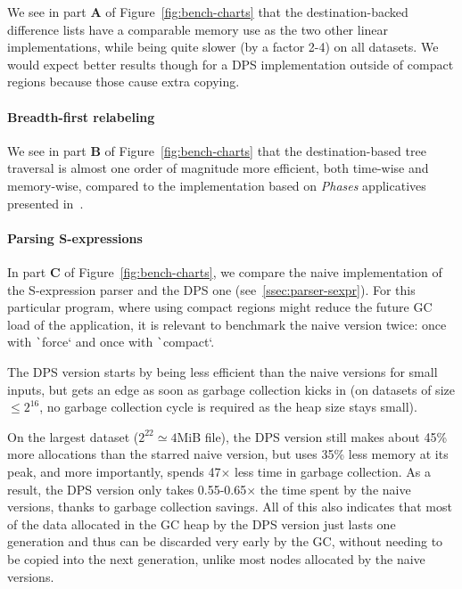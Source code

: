 \documentclass[english]{jflart}
\begin{document}
We see in part \textbf{A} of Figure~\ref{fig:bench-charts} that the destination-backed difference lists have a comparable memory use as the two other linear implementations, while being quite slower (by a factor 2-4) on all datasets. We would expect better results though for a DPS implementation outside of compact regions because those cause extra copying.

\paragraph{Breadth-first relabeling}\label{par:benchmark-bf-tree-traversal}

We see in part \textbf{B} of Figure~\ref{fig:bench-charts} that the destination-based tree traversal is almost one order of magnitude more efficient, both time-wise and memory-wise, compared to the implementation based on \emph{Phases} applicatives presented in~\cite{gibbons_phases_2023}.

\paragraph{Parsing S-expressions}

In part \textbf{C} of Figure~\ref{fig:bench-charts}, we compare the naive implementation of the S-expression parser and the DPS one (see~\ref{ssec:parser-sexpr}). For this particular program, where using compact regions might reduce the future GC load of the application, it is relevant to benchmark the naive version twice: once with \texttt`force` and once with \texttt`compact`.

The DPS version starts by being less efficient than the naive versions for small inputs, but gets an edge as soon as garbage collection kicks in (on datasets of size $\leq 2^{16}$, no garbage collection cycle is required as the heap size stays small).

On the largest dataset ($2^{22} \simeq 4$MiB file), the DPS version still makes about 45\% more allocations than the starred naive version, but uses 35\% less memory at its peak, and more importantly, spends 47$\times$ less time in garbage collection. As a result, the DPS version only takes 0.55-0.65$\times$ the time spent by the naive versions, thanks to garbage collection savings. All of this also indicates that most of the data allocated in the GC heap by the DPS version just lasts one generation and thus can be discarded very early by the GC, without needing to be copied into the next generation, unlike most nodes allocated by the naive versions.
\end{document}
